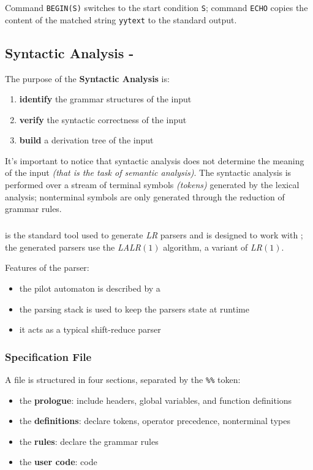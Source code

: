 \documentclass[english]{article}
\begin{document}
Command \texttt{BEGIN(S)} switches to the start condition \texttt{S};
command \texttt{ECHO} copies the content of the matched string \texttt{yytext} to the standard output.

\subsection{Syntactic Analysis - \bison}

The purpose of the \textbf{Syntactic Analysis} is:

\begin{enumerate}
  \item \textbf{identify} the grammar structures of the input
  \item \textbf{verify} the syntactic correctness of the input
  \item \textbf{build} a derivation tree of the input
\end{enumerate}

It's important to notice that syntactic analysis does not determine the meaning of the input \textit{(that is the task of semantic analysis)}.
The syntactic analysis is performed over a stream of terminal symbols \textit{(tokens)} generated by the lexical analysis;
nonterminal symbols are only generated through the reduction of grammar rules.

\subparagraph*{\bison}

\bison is the standard tool used to generate \textit{LR} parsers and is designed to work with \flex;
the generated parsers use the \textit{LALR\((1)\)} algorithm, a variant of \textit{LR\((1)\)}.

Features of the parser:

\begin{itemize}
  \item the pilot automaton is described by a \FSA
  \item the parsing stack is used to keep the parsers state at runtime
  \item it acts as a typical shift-reduce parser
\end{itemize}

\subsubsection{Specification File}

A \bison file is structured in four sections, separated by the \texttt{\%\%} token:

\begin{itemize}
  \item the \textbf{prologue}: include headers, global variables, and function definitions
  \item the \textbf{definitions}: declare tokens, operator precedence, nonterminal types
  \item the \textbf{rules}: declare the grammar rules
  \item the \textbf{user code}: \clang code
\end{itemize}
\end{document}
